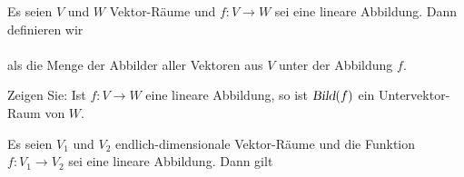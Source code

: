 \begin{Definition}[Bild]
Es seien $V$ und $W$ Vektor-R\"{a}ume und $f:V \rightarrow W$ sei eine lineare Abbildung.  Dann 
definieren wir
\\[0.2cm]
\hspace*{1.3cm}
\colorbox{red}{}
\\[0.2cm]
als die Menge der Abbilder aller Vektoren aus $V$ unter der Abbildung $f$.
\eoxs
\end{Definition}

\exercise
Zeigen Sie: Ist $f: V \rightarrow W$ eine lineare Abbildung, so ist $\textsl{Bild}(f)$ ein Untervektor-Raum von $W$.
\eoxs

\begin{Satz}
  Es seien $V_1$ und $V_2$ endlich-dimensionale Vektor-R\"{a}ume und die Funktion $f: V_1 \rightarrow V_2$ sei eine lineare Abbildung.
  Dann gilt
  \\[0.2cm]
  \hspace*{1.3cm}
  \colorbox{red}{}
\end{Satz}

